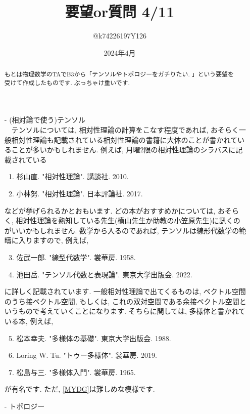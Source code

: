 \documentclass[10pt,a4paper]{jsarticle}
\title{要望or質問 4/11}
\author{@k74226197Y126}
\date{2024年4月}
\begin{document}
 
\maketitle
\begin{abstract}
    もとは物理数学のTAでB3から「テンソルやトポロジーをガチりたい. 」という要望を受けて作成したものです. ぶっちゃけ重いです. 
\end{abstract}
\begin{itemize}
    \item[-] (相対論で使う)テンソル\\
    　テンソルについては, 相対性理論の計算をこなす程度であれば, おそらく一般相対性理論も記載されている相対性理論の書籍に大体のことが書かれていることが多いかもしれません. 例えば, 月曜2限の相対性理論のシラバスに記載されている
    \begin{enumerate}
        \item 杉山直. "相対性理論". 講談社. 2010. 
        \item 小林努. "相対性理論". 日本評論社. 2017. 
    \end{enumerate} 
    などが挙げられるかとおもいます. どの本がおすすめかについては, おそらく, 相対性理論を熟知している先生(横山先生か助教の小笠原先生)に訊くのがいいかもしれません. 数学から入るのであれば, テンソルは線形代数学の範疇に入りますので, 例えば, 
    \begin{enumerate}
    \setcounter{enumi}{2}
        \item 佐武一郎. "線型代数学". 裳華房. 1958.
        \item 池田岳. "テンソル代数と表現論". 東京大学出版会. 2022.
    \end{enumerate}
    に詳しく記載されています. 一般相対性理論で出てくるものは, ベクトル空間のうち接ベクトル空間, もしくは, これの双対空間である余接ベクトル空間というもので考えていくことになります. そちらに関しては, 多様体と書かれている本, 例えば, 
    \begin{enumerate}
    \setcounter{enumi}{4}
        \item 松本幸夫. "多様体の基礎". 東京大学出版会. 1988.
        \item Loring W. Tu. "トゥー多様体". 裳華房. 2019. 
        \item \label{MYDG} 松島与三. "多様体入門". 裳華房. 1965. 
    \end{enumerate}
    が有名です. ただ, \ref{MYDG}は難しめな模様です. 
    \item[-] トポロジー\\

\end{itemize}
\end{document}
